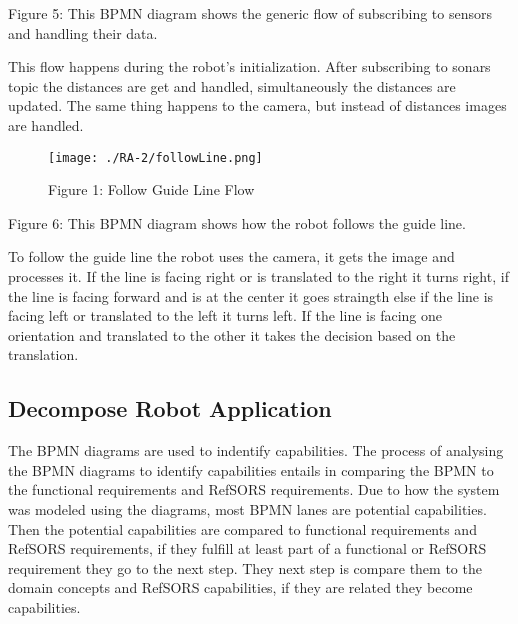 Figure 5: This BPMN diagram shows the generic flow of subscribing to sensors and handling their data.

This flow happens during the robot's initialization. After subscribing to sonars topic the distances are get and handled, simultaneously the distances are updated. The same thing happens to the camera, but instead of distances images are handled.

\begin{figure}[ht!]
 \centering
 \texttt{[image: ./RA-2/followLine.png]}
 \caption{Figure 1: Follow Guide Line Flow}
 \label{fig:followline}
\end{figure}

Figure 6: This BPMN diagram shows how the robot follows the guide line.

To follow the guide line the robot uses the camera, it gets the image and processes it. If the line is facing right or is translated to the right it turns right, if the line is facing forward and is at the center it goes straingth else if the line is facing left or translated to the left it turns left. If the line is facing one orientation and translated to the other it takes the decision based on the translation.

\subsection{Decompose Robot Application}

The BPMN diagrams are used to indentify capabilities. The process of analysing the BPMN diagrams to identify capabilities entails in comparing the BPMN to the functional requirements and RefSORS requirements. Due to how the system was modeled using the diagrams, most BPMN lanes are potential capabilities. Then the potential capabilities are compared to functional requirements and RefSORS requirements, if they fulfill at least part of a functional or RefSORS requirement they go to the next step. They next step is compare them to the domain concepts and RefSORS capabilities, if they are related they become capabilities.

